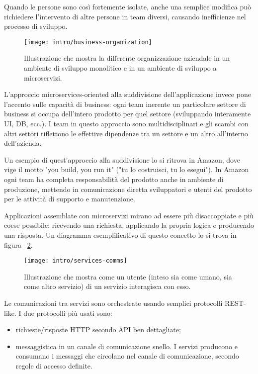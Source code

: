 Quando le persone sono così fortemente isolate, anche una semplice modifica può richiedere l'intervento di altre persone in team diversi, causando inefficienze nel processo di sviluppo.

\begin{figure}[H]
  \centering
  \texttt{[image: intro/business-organization]}
  \caption{Illustrazione che mostra la differente organizzazione aziendale in un ambiente di sviluppo monolitico e in un ambiente di sviluppo a microservizi.}
  \label{fig:business-organization}
\end{figure}

L'approccio microservices-oriented alla suddivisione dell'applicazione invece pone l'accento sulle capacità di business: ogni team inerente un particolare settore di business si occupa dell'intero prodotto per quel settore (sviluppando interamente UI, DB, ecc.).
I team in questo approccio sono multidisciplinari e gli scambi con altri settori riflettono le effettive dipendenze tra un settore e un altro all'interno dell'azienda.

Un esempio di quest'approccio alla suddivisione lo si ritrova in Amazon, dove vige il motto "you build, you run it" ("tu lo costruisci, tu lo esegui").
In Amazon ogni team ha completa responsabilità del prodotto anche in ambiente di produzione, mettendo in comunicazione diretta sviluppatori e utenti del prodotto per le attività di supporto e manutenzione.

Applicazioni assemblate con microservizi mirano ad essere più disaccoppiate e più coese possibile: ricevendo una richiesta, applicando la propria logica e producendo una risposta.
Un diagramma esemplificativo di questo concetto lo si trova in figura ~\ref{fig:services-comms}.

\begin{figure}[!ht]
    \centering
    \texttt{[image: intro/services-comms]}
    \caption{Illustrazione che mostra come un utente (inteso sia come umano, sia come altro servizio) di un servizio interagisca con esso.}
    \label{fig:services-comms}
\end{figure}

Le comunicazioni tra servizi sono orchestrate usando semplici protocolli REST-like. I due protocolli più usati sono:
\begin{itemize}
  \item richieste/risposte HTTP secondo API ben dettagliate;
  \item messaggistica in un canale di comunicazione snello. I servizi producono e consumano i messaggi che circolano nel canale di comunicazione, secondo regole di accesso definite.
\end{itemize}


